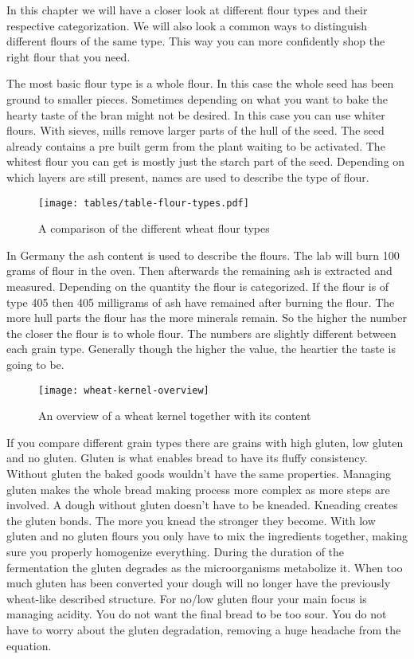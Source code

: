 In this chapter we will have a closer look at different flour types
and their respective categorization. We will also look a common
ways to distinguish different flours of the same type. This way you can more confidently
shop the right flour that you need.

The most basic flour type is a whole flour. In this case the whole seed has
been ground to smaller pieces. Sometimes depending on what you want to bake
the hearty taste of the bran might not be desired. In this case you can use
whiter flours. With sieves, mills remove larger parts of the hull of the seed.
The seed already contains a pre built germ from the plant waiting to be
activated. The whitest flour you can get is mostly just the starch part of the seed.
Depending on which layers are still present, names are used to describe the
type of flour.

\begin{figure}[!htb]
  \texttt{[image: tables/table-flour-types.pdf]}
  \label{tab:flour-types-comparison}
  \caption{A comparison of the different wheat flour types}
\end{figure}

In Germany the ash content is used to describe the flours. The lab will burn
100 grams of flour in the oven. Then afterwards the remaining ash is extracted
and measured. Depending on the quantity the flour is categorized. If the flour
is of type 405 then 405 milligrams of ash have remained after burning the
flour. The more hull parts the flour has the more minerals remain. So the
higher the number the closer the flour is to whole flour. The numbers are
slightly different between each grain type. Generally though the higher the
value, the heartier the taste is going to be.

\begin{figure}[htb!]
  \texttt{[image: wheat-kernel-overview]}
  \caption{An overview of a wheat kernel together with its content}
  \label{fig:wheat-kernel-overview}
\end{figure}

If you compare different grain types there are grains with high gluten, low gluten
and no gluten. Gluten is what enables bread to have its fluffy consistency.
Without gluten the baked goods wouldn't have the same properties. Managing
gluten makes the whole bread making process more complex as more steps are involved.
A dough without gluten doesn't have to be kneaded. Kneading creates
the gluten bonds. The more you knead the stronger they become. With low
gluten and no gluten flours you only have to mix the ingredients together, making
sure you properly homogenize everything. During the duration of the fermentation
the gluten degrades as the microorganisms metabolize it. When too much gluten
has been converted your dough will no longer have the previously wheat-like described
structure. For no/low gluten flour your main focus is managing acidity. You do not
want the final bread to be too sour. You do not have to worry about the gluten
degradation, removing a huge headache from the equation.

